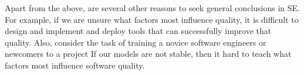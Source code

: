 \documentclass[10pt,journal,compsoc]{IEEEtran}
\begin{document}
{\color{blue} Apart from the above,  are several other reasons to seek general conclusions in SE. For example, 
if we are unsure what factors most influence quality, it is difficult to design and implement and deploy tools that can successfully improve that quality.
Also,
consider the task of training a   novice software engineers or newcomers to a project If our models are not stable, then it hard to teach what factors  most influence software quality.}





\end{document}
